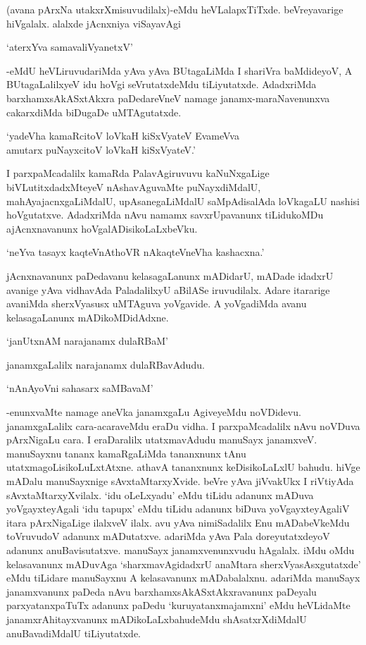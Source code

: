 (avana pArxNa utakxrXmisuvudilalx)-eMdu heVLalapxTiTxde. beVreyavarige hiVgalalx. alalxde jAcnxniya viSayavAgi

\begin{shloka}
`aterxYva samavaliVyanetxV'
\end{shloka}

-eMdU heVLiruvudariMda yAva yAva BUtagaLiMda I shariVra baMdideyoV, A BUtagaLalilxyeV idu hoVgi seVrutatxdeMdu tiLiyutatxde. AdadxriMda barxhamxsAkASxtAkxra paDedareVneV namage janamx-maraNavenunxva cakarxdiMda biDugaDe uMTAgutatxde.

\begin{shloka}
`yadeVha kamaRcitoV loVkaH kiSxVyateV EvameVva\\
amutarx puNayxcitoV loVkaH kiSxVyateV.'
\end{shloka}

I parxpaMcadalilx kamaRda PalavAgiruvuvu kaNuNxgaLige biVLutitxdadxMteyeV nAshavAguvaMte puNayxdiMdalU, mahAyajacnxgaLiMdalU, upAsanegaLiMdalU saMpAdisalAda loVkagaLU nashisi hoVgutatxve. AdadxriMda nAvu namamx savxrUpavanunx tiLidukoMDu ajAcnxnavanunx hoVgalADisikoLaLxbeVku.

\begin{shloka}
`neYva tasayx kaqteVnAthoVR nAkaqteVneVha kashacxna.'
\end{shloka}

jAcnxnavanunx paDedavanu kelasagaLanunx mADidarU, mADade idadxrU avanige yAva vidhavAda PaladalilxyU aBilASe iruvudilalx. Adare itararige avaniMda sherxVyasusx uMTAguva yoVgavide. A yoVgadiMda avanu kelasagaLanunx mADikoMDidAdxne.

\begin{shloka}
`janUtxnAM narajanamx dulaRBaM'
\end{shloka}

janamxgaLalilx narajanamx dulaRBavAdudu.

\begin{shloka}
`nAnAyoVni sahasarx saMBavaM'
\end{shloka}

-enunxvaMte namage aneVka janamxgaLu AgiveyeMdu noVDidevu. janamxgaLalilx cara-acaraveMdu eraDu vidha. I parxpaMcadalilx nAvu noVDuva pArxNigaLu cara. I eraDaralilx utatxmavAdudu manuSayx janamxveV. manuSayxnu tananx kamaRgaLiMda tananxnunx tAnu utatxmagoLisikoLuLxtAtxne. athavA tananxnunx keDisikoLaLxlU bahudu. hiVge mADalu manuSayxnige sAvxtaMtarxyXvide. beVre yAva jiVvakUkx I riVtiyAda sAvxtaMtarxyXvilalx. `idu oLeLxyadu' eMdu tiLidu adanunx mADuva yoVgayxteyAgali `idu tapupx' eMdu tiLidu adanunx biDuva yoVgayxteyAgaliV itara pArxNigaLige ilalxveV ilalx. avu yAva nimiSadalilx Enu mADabeVkeMdu toVruvudoV adanunx mADutatxve. adariMda yAva Pala doreyutatxdeyoV adanunx anuBavisutatxve. manuSayx janamxvenunxvudu hAgalalx. iMdu oMdu kelasavanunx mADuvAga `sharxmavAgidadxrU anaMtara sherxVyasAsxgutatxde' eMdu tiLidare manuSayxnu A kelasavanunx mADabalalxnu. adariMda manuSayx janamxvanunx paDeda nAvu barxhamxsAkASxtAkxravanunx paDeyalu parxyatanxpaTuTx adanunx paDedu `kuruyatanxmajamxni' eMdu heVLidaMte janamxrAhitayxvanunx mADikoLaLxbahudeMdu shAsatxrXdiMdalU anuBavadiMdalU tiLiyutatxde.

